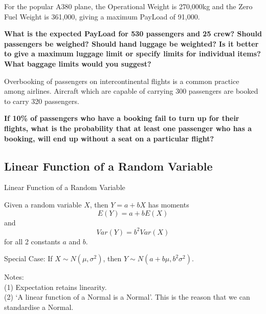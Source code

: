 \documentclass[t,xcolor=pdftex,dvipsnames,table]{beamer}
\begin{document}
\begin{frame}{}

For the popular A380 plane, the Operational Weight is 270,000kg and the Zero Fuel Weight is 361,000, giving a maximum PayLoad of 91,000.
\href{hthttps://en.wikipedia.org/wiki/Airbus_A380}{}
\href{http://aviation.stackexchange.com/questions/1008/what-is-the-weight-budget-of-a-fully-loaded-a380}{}

\vspace{.5cm}
{\bf What is the expected PayLoad for 530 passengers and 25 crew? Should passengers be weighed? Should hand luggage be weighted? Is it better to give a maximum luggage limit or specify limits for individual items? What baggage limits would you suggest?}

\vspace{.5cm}
Overbooking of passengers on intercontinental flights is a common practice among airlines. Aircraft which are capable of carrying 300 passengers are booked to carry 320 passengers. 

\vspace{.5cm}
{\bf If 10\% of passengers who have a booking fail
to turn up for their flights, what is the probability that at least one passenger
who has a booking, will end up without a seat on a particular flight?}

\end{frame}


\subsection[Linear Function]{Linear Function of a Random Variable}
\begin{frame}{Linear Function of a Random Variable}
\begin{definition}
Given a random variable $X$, then $Y = a + b X$ has moments
\[ \boxed{ E(Y) = a + b E(X) } \]
and
\[ \boxed{ Var(Y) = b^2 Var(X) } \]
for all 2 constants $a$ and $b$.

\vspace{.5cm}
Special Case:
If $X \sim N(\mu, \sigma^2)$, then $Y \sim N(a + b \mu, b^2 \sigma^2)$. 

\end{definition}

Notes:  \\
(1) Expectation retains linearity. \\
(2) `A linear function of a Normal is a Normal'. This is the reason that we can standardise a Normal.
\end{frame}
\end{document}
